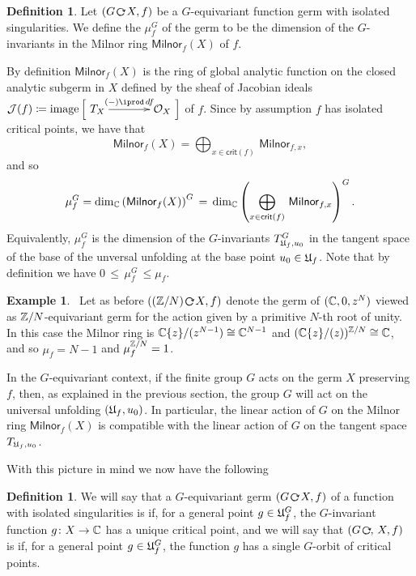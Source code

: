 \documentclass[twoside,leqno]{article}
\numberwithin{equation}{section}
\theoremstyle{plain}
\theoremstyle{definition}
\newtheorem{definition}[equation]{Definition}
\newtheorem{example}[equation]{Example}
\begin{document}
\begin{definition} Let $(G\, \actleft\, X,f)$ be a $G$-equivariant function germ with isolated singularities.
We define the  $\mu_f^{G}$ of the germ  to be the dimension of the $G$-invariants in the Milnor ring $\mathsf{Milnor}_{f}(X)$ of $f$.
\end{definition}

By definition $\mathsf{Milnor}_{f}(X)$ is the ring of global analytic function on the closed analytic subgerm in 
$X$ defined by the sheaf of Jacobian ideals $\mathcal{J}(f) \coloneqq \op{image}\Big[\xymatrix@1@C+1pc@M+0.2pc{T_{X} \ar[r]^-{(-)\iprod \, df} & \cO_{X}}\Big]$ of $f$. Since by assumption $f$ has isolated critical points, we
have that 
\[
\mathsf{Milnor}_{f}(X) = \bigoplus_{x \in \mathsf{crit}(f)} \, \mathsf{Milnor}_{f,x},
\]
and so
\[
\mu_f^G = \dim_{\mathbb C} \left(\mathsf{Milnor}_{f}(X)\right)^{G} \, = \, 
\dim_\mathbb{C} \left(\bigoplus_{x \in \mathsf{crit}(f)} \, \mathsf{Milnor}_{f,x}\right)^G.
\]
Equivalently, $\mu_{f}^{G}$ is the dimension of the $G$-invariants $T_{\mathfrak{U}_{f},u_{0}}^{G}$ in the 
tangent space of the base of the unversal unfolding at the base point $u_{0} \in \mathfrak{U}_{f}$.
Note that by definition we have $0 \, \leq \, \mu_{f}^{G} \, \leq \mu_{f}$.

\begin{example} \ Let as before $((\bbZ/N)\,  \actleft \, X,f)$ denote the 
germ of $(\mathbb C,0,z^{N})$ viewed as $\mathbb Z/N$-equivariant germ for the action given by a primitive $N$-th root of unity.   In this case the Milnor ring is $\mathbb C\{z\}/(z^{N-1}) \cong \mathbb C^{N-1}$ and
$(\mathbb{C}\{z\}/(z))^{\mathbb Z/N} \cong \mathbb C$, 
and so $\mu_{f} = N-1$ and $\mu_{f}^{\mathbb Z/N} =  1$.
\end{example}
 
In the $G$-equivariant context, if the finite group $G$ acts on the germ $X$ preserving $f$, then, as explained in the previous section, the group $G$ will act on the universal unfolding $(\mathfrak{U}_{f},u_{0})$. In particular, the linear action of $G$ on the Milnor ring  $\mathsf{Milnor}_{f}(X)$ is compatible with the linear action of $G$  on the tangent space $T_{\mathfrak{U}_{f},u_{0}}$. 

With this picture in mind we now have the following

\begin{definition}
We will say that a  $G$-equivariant germ  $(G \, \actleft \, X,f)$ of a function with isolated singularities is   if, for a general point $g \in \mathfrak{U}_f^{G}$, the $G$-invariant function $g \colon X \to \mathbb C$ has a unique critical point, and we will say that $(G\, \actleft, \, X,f)$ is   if, for a  general point $g \in \mathfrak{U}_f^{G}$, the function $g$  has a single $G$-orbit of critical points.
\end{definition}
\end{document}
